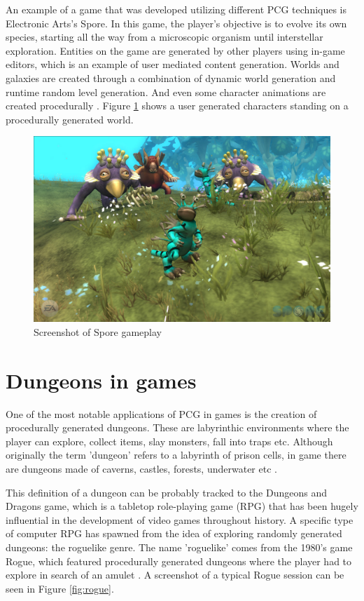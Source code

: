 An example of a game that was developed utilizing different PCG techniques is Electronic Arts's Spore. In this game, the player's objective is to evolve its own species, starting all the way from a microscopic organism until interstellar exploration. Entities on the game are generated by other players using in-game editors, which is an example of user mediated content generation. Worlds and galaxies are created through a combination of dynamic world generation and runtime random level generation. And even some character animations are created procedurally \cite{wright:2007}. Figure \ref{fig:spore} shows a user generated characters standing on a procedurally generated world.

\begin{figure}[h]
    \caption{Screenshot of Spore gameplay}
    \centerline{\includegraphics[width=13cm]{images/introduction/spore.jpg}}
    \label{fig:spore}
\end{figure}


\section{Dungeons in games}

One of the most notable applications of PCG in games is the creation of procedurally generated dungeons. These are labyrinthic environments where the player can explore, collect items, slay monsters, fall into traps etc. Although originally the term 'dungeon' refers to a labyrinth of prison cells, in game there are dungeons made of caverns, castles, forests, underwater etc \cite{shaker:2016}. 

This definition of a dungeon can be probably tracked to the Dungeons and Dragons game, which is a tabletop role-playing game (RPG) that has been hugely influential in the development of video games throughout history. A specific type of computer RPG has spawned from the idea of exploring randomly generated dungeons: the roguelike genre. The name 'roguelike' comes from the 1980's game Rogue, which featured procedurally generated dungeons where the player had to explore in search of an amulet \cite{brewer:2016}. A screenshot of a typical Rogue session can be seen in Figure \ref{fig:rogue}.

